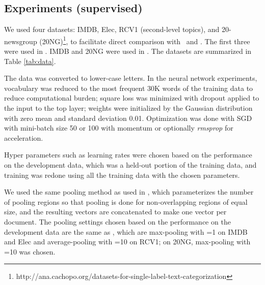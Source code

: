 \documentclass{article}
\begin{document}
\subsection{Experiments (supervised)} 
\label{sec:supexp}


We used four datasets: 
IMDB, Elec, RCV1 (second-level topics), 
and 
20-newsgroup (20NG)\footnote{
http://ana.cachopo.org/datasets-for-single-label-text-categorization
}, to facilitate direct comparison with \JZab\ and \DLa.  
The first three were used in \JZab.  IMDB and 20NG were used in \DLa.  
The datasets are summarized in Table \ref{tab:data}. 

The data was converted to lower-case letters.  
In the neural network experiments, 
vocabulary was reduced to 
the most frequent 30K words of the training data to reduce computational burden; 
square loss was minimized with 
dropout \cite{dropout12} applied to the input to the top layer; 
weights were initialized by the Gaussian distribution with zero mean and 
standard deviation 0.01.  
Optimization was done with SGD with mini-batch size 50 or 100 
with momentum or optionally 
{\em rmsprop} \cite{rmsprop} for acceleration.  

Hyper parameters such as learning rates 
were chosen based on the performance on the development data, 
which was a held-out portion of the training data, and training was redone using all the 
training data with the chosen parameters.

We used the same pooling method as used in \JZab, which parameterizes the number of pooling regions so that 
pooling is done for  non-overlapping regions of equal size, and the resulting  vectors are concatenated 
to make one vector per document.  
The pooling settings chosen based on the performance on the development data are 
the same as \JZa, which are 
max-pooling with =1 on IMDB and Elec and average-pooling with =10 on RCV1; 
on 20NG, max-pooling with =10 was chosen.  

\newcommand{\dl}{}
\newcommand{\jza}{}
\newcommand{\jzb}{}
\end{document}
